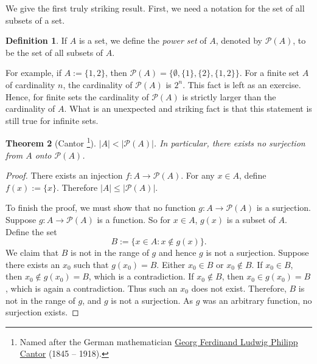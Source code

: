 \documentclass[12pt]{book}
\newcommand{\abs}[1]{\left\lvert {#1} \right\rvert}
\newcommand{\sP}{{\mathcal{P}}}
\newcommand{\myindex}[1]{#1\index{#1}}
\theoremstyle{plain}
\newtheorem{thm}{Theorem}[section]
\theoremstyle{remark}
\theoremstyle{definition}
\newtheorem{defn}[thm]{Definition}
\theoremstyle{exercise}
\theoremstyle{example}
\begin{document}

We give the first truly striking result.  First, we need a notation for
the set of all subsets of a set.

\begin{defn}
If $A$ is a set,
we define the \emph{\myindex{power set}} of $A$, denoted by $\sP(A)$, to be
the set of all subsets of $A$.
\end{defn}

For example, if $A := \{ 1,2\}$, then $\sP(A) = \{ \emptyset, \{ 1 \}, \{ 2 \},
\{ 1, 2 \} \}$.  For a finite set $A$ of cardinality $n$, the
cardinality of $\sP(A)$ is $2^n$.  This fact is left as an exercise.  
Hence, for finite sets
the cardinality of $\sP(A)$ is strictly
larger than the
cardinality of $A$.  What is an unexpected and
striking fact is that this statement is still true for infinite sets.

\begin{thm}[Cantor%
\footnote{Named after the German mathematician
\href{http://en.wikipedia.org/wiki/Georg_Cantor}{Georg Ferdinand Ludwig
Philipp Cantor} (1845 -- 1918).}]
\label{cantorspowersetthm}
$\abs{A} < \abs{\sP(A)}$.  In particular, there exists no surjection from
$A$ onto $\sP(A)$.
\end{thm}

\begin{proof}
There exists an injection $f \colon A \to \sP(A)$.
For any $x \in A$, define $f(x) := \{ x \}$.  Therefore
$\abs{A} \leq \abs{\sP(A)}$.

To finish the proof, we must show that
no function $g \colon A \to \sP(A)$ is a surjection.
Suppose 
$g \colon A \to \sP(A)$ is a function.  So for $x \in A$,
$g(x)$ is a subset of $A$.  Define the set
\begin{equation*}
B := \{ x \in A : x \notin g(x) \} .
\end{equation*}
We claim that $B$ is not in the range of $g$ and hence $g$ is not a
surjection.  Suppose there exists an $x_0$ such that $g(x_0) = B$.
Either $x_0 \in B$ or $x_0 \notin B$.  If $x_0 \in B$, then $x_0 \notin
g(x_0) = B$, which is a contradiction.  If $x_0 \notin B$, then $x_0 \in
g(x_0) = B$, which is again a contradiction.  Thus such an $x_0$ does not
exist.  Therefore, $B$ is not in the range of $g$, and $g$ is not a
surjection.  As $g$ was an arbitrary function, no surjection exists.
\end{proof}
\end{document}
